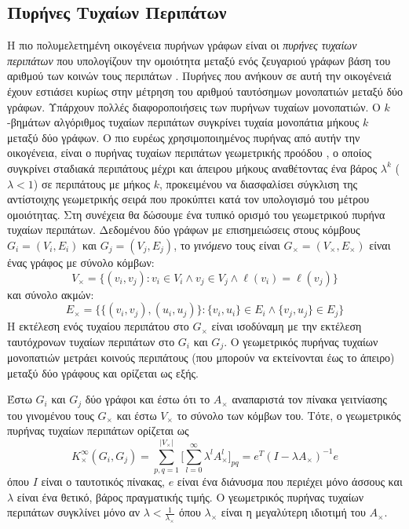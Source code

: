 \subsection{Πυρήνες Τυχαίων Περιπάτων}
Η πιο πολυμελετημένη οικογένεια πυρήνων γράφων είναι οι \textit{πυρήνες τυχαίων περιπάτων} που υπολογίζουν την ομοιότητα μεταξύ ενός ζευγαριού γράφων βάση του αριθμού των κοινών τους περιπάτων \cite{kashima2003marginalized,gartner2003graph,mahe2004extensions,borgwardt2005protein,vishwanathan2010graph,sugiyama2015halting}.
Πυρήνες που ανήκουν σε αυτή την οικογένειά έχουν εστιάσει κυρίως στην μέτρηση του αριθμού ταυτόσημων μονοπατιών μεταξύ δύο γράφων.
Υπάρχουν πολλές διαφοροποιήσεις των πυρήνων τυχαίων μονοπατιών.
Ο $k$-βημάτων αλγόριθμος τυχαίων περιπάτων συγκρίνει τυχαία μονοπάτια μήκους $k$ μεταξύ δύο γράφων.
Ο πιο ευρέως χρησιμοποιημένος πυρήνας από αυτήν την οικογένεια, είναι ο πυρήνας τυχαίων περιπάτων γεωμετρικής προόδου \cite{gartner2003graph}, ο οποίος συγκρίνει σταδιακά περιπάτους μέχρι και άπειρου μήκους αναθέτοντας ένα βάρος $\lambda^k$ ($\lambda < 1$) σε περιπάτους με μήκος $k$, προκειμένου να διασφαλίσει σύγκλιση της αντίστοιχης γεωμετρικής σειρά που προκύπτει κατά τον υπολογισμό του μέτρου ομοιότητας.
Στη συνέχεια θα δώσουμε ένα τυπικό ορισμό του γεωμετρικού πυρήνα τυχαίων περιπάτων.
Δεδομένου δύο γράφων με επισημειώσεις στους κόμβους $G_i=(V_i,E_i)$ και $G_j=(V_j,E_j)$, το \textit{γινόμενο} τους είναι $G_\times=(V_\times,E_\times)$ είναι ένας γράφος με σύνολο κόμβων:
\begin{equation}
	V_{\times} = \{(v_i,v_j) : v_i \in V_i \wedge v_j \in V_j \wedge \ell(v_i) = \ell(v_j) \} 
\end{equation}
και σύνολο ακμών:
\begin{equation}
	E_{\times} = \{\{(v_i,v_j),(u_i,u_j)\} : \{v_i,u_i\} \in E_i \wedge \{v_j,u_j\} \in E_j\}
\end{equation}
Η εκτέλεση ενός τυχαίου περιπάτου στο $G_{\times}$ είναι ισοδύναμη με την εκτέλεση ταυτόχρονων τυχαίων περιπάτων στο $G_i$ και $G_j$.
Ο γεωμετρικός πυρήνας τυχαίων μονοπατιών μετράει κοινούς περιπάτους (που μπορούν να εκτείνονται έως το άπειρο) μεταξύ δύο γράφους και ορίζεται ως εξής.
\begin{definition}
	Έστω $G_i$ και $G_j$ δύο γράφοι και έστω ότι το $A_\times$ αναπαριστά τον πίνακα γειτνίασης του γινομένου τους $G_\times$ και έστω $V_\times$ το σύνολο των κόμβων του.
	Τότε, ο γεωμετρικός πυρήνας τυχαίων περιπάτων ορίζεται ως
	\begin{equation}
    	K_{\times}^{\infty}(G_i,G_j) = \sum_{p,q=1}^{|V_{\times}|} \Big[ \sum_{l=0}^{\infty} \lambda^l A_{\times}^l \Big]_{pq} = e^T(I - \lambda A_{\times})^{-1} e
    \end{equation}
	όπου $I$ είναι ο ταυτοτικός πίνακας, $e$ είναι ένα διάνυσμα που περιέχει μόνο άσσους και $\lambda$ είναι ένα θετικό, βάρος πραγματικής τιμής.
	Ο γεωμετρικός πυρήνας τυχαίων περιπάτων συγκλίνει μόνο αν  $\lambda < \frac{1}{\lambda_\times}$ όπου $\lambda_\times$ είναι η μεγαλύτερη ιδιοτιμή του $A_{\times}$.
\end{definition}
